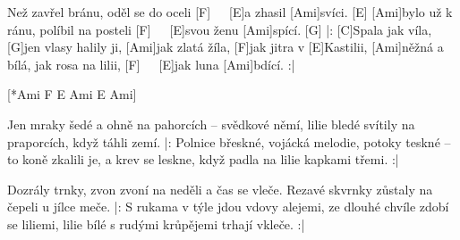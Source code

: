 
\sloka
[Ami]Než zavřel bránu, oděl se do oceli [F]\ \ \ [E]a zhasil [Ami]svíci. [E]
[Ami]bylo už k ránu, políbil na posteli [F]\ \ \ [E]svou ženu [Ami]spící. [G]
|: [C]Spala jak víla, [G]jen vlasy halily ji,
[Ami]jak zlatá žíla, [F]jak jitra v [E]Kastilii,
[Ami]něžná a bílá, jak rosa na lilii,
[F]\ \ \ [E]jak luna [Ami]bdící. :|

[*Ami F E Ami E Ami]

\sloka
Jen mraky šedé a ohně na pahorcích – svědkové němí,
lilie bledé svítily na praporcích, když táhli zemí.
|: Polnice břeskné, vojácká melodie,
potoky teskné – to koně zkalili je,
a krev se leskne, když padla na lilie kapkami třemi. :|


\sloka
Dozrály trnky, zvon zvoní na neděli a čas se vleče.
Rezavé skvrnky zůstaly na čepeli u jílce meče.
|: S rukama v týle jdou vdovy alejemi,
ze dlouhé chvíle zdobí se liliemi,
lilie bílé s rudými krůpějemi trhají vkleče. :|

